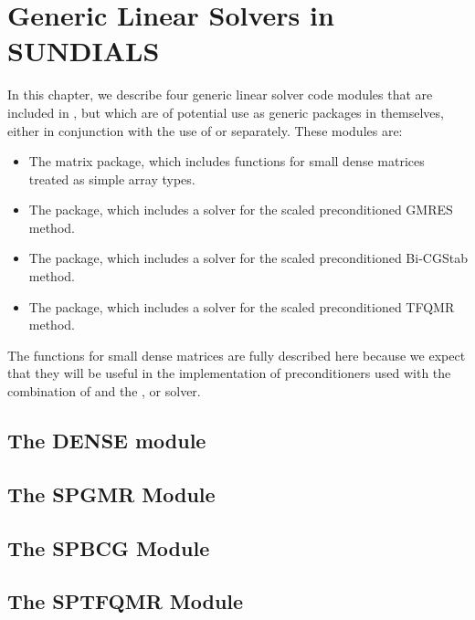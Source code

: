\chapter{Generic Linear Solvers in SUNDIALS}\label{s:gen_linsolv}
In this chapter, we describe four generic linear solver code modules that 
are included in {\sundials}, but which are of potential use as generic packages in
themselves, either in conjunction with the use of {\kinsol} or separately.
These modules are:
\begin{itemize}
\item The {\dense} matrix package, which includes functions
      for small dense matrices treated as simple array types.
\item The {\spgmr} package, which includes a solver for the scaled
      preconditioned GMRES method.
\item The {\spbcg} package, which includes a solver for the scaled
      preconditioned Bi-CGStab method.
\item The {\sptfqmr} package, which includes a solver for the scaled
      preconditioned TFQMR method.
\end{itemize}

The functions for small dense matrices are fully
described here because we expect that they will be useful in the
implementation of preconditioners used with the combination of {\kinsol}
and the {\kinspgmr}, {\kinspbcg} or {\kinsptfqmr} solver.

\section{The DENSE module}\label{ss:dense}


\section{The SPGMR Module}\label{ss:spgmr}


\section{The SPBCG Module}\label{ss:spbcg}


\section{The SPTFQMR Module}\label{ss:sptfqmr}


